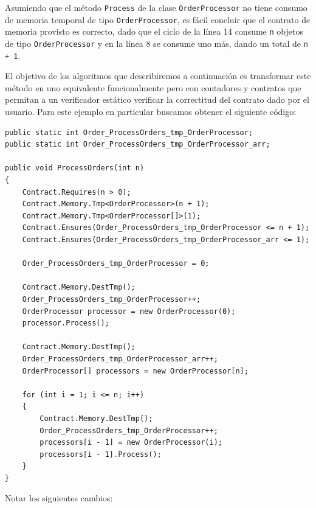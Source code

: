\documentclass[12pt,a4paper]{article}
\newcommand\mono[1]{\texttt{#1}}
\begin{document}
			Asumiendo que el método \mono{Process} de la clase \mono{OrderProcessor} no tiene consumo de memoria temporal de tipo \mono{OrderProcessor}, es fácil concluir que el contrato de memoria provisto es correcto, dado que el ciclo de la línea 14 consume \mono{n} objetos de tipo \mono{OrderProcessor} y en la línea 8 se consume uno más, dando un total de \mono{n + 1}.

			El objetivo de los algoritmos que describiremos a continuación es transformar este método en uno equivalente funcionalmente pero con contadores y contratos que permitan a un verificador estático verificar la correctitud del contrato dado por el usuario. Para este ejemplo en particular buscamos obtener el siguiente código:

			\vspace{15pt}
			\begin{lstlisting}[caption=Ejemplo motivacional para instrumentación (instrumentado), label=ejanotinstrinst]
public static int Order_ProcessOrders_tmp_OrderProcessor;
public static int Order_ProcessOrders_tmp_OrderProcessor_arr;

public void ProcessOrders(int n)
{
	Contract.Requires(n > 0);
	Contract.Memory.Tmp<OrderProcessor>(n + 1);
	Contract.Memory.Tmp<OrderProcessor[]>(1);
	Contract.Ensures(Order_ProcessOrders_tmp_OrderProcessor <= n + 1);
	Contract.Ensures(Order_ProcessOrders_tmp_OrderProcessor_arr <= 1);

	Order_ProcessOrders_tmp_OrderProcessor = 0;

	Contract.Memory.DestTmp();
	Order_ProcessOrders_tmp_OrderProcessor++;
	OrderProcessor processor = new OrderProcessor(0);
	processor.Process();

	Contract.Memory.DestTmp();
	Order_ProcessOrders_tmp_OrderProcessor_arr++;
	OrderProcessor[] processors = new OrderProcessor[n];

	for (int i = 1; i <= n; i++)
	{
		Contract.Memory.DestTmp();
		Order_ProcessOrders_tmp_OrderProcessor++;
		processors[i - 1] = new OrderProcessor(i);
		processors[i - 1].Process();
	}
}
			\end{lstlisting}

			Notar los siguientes cambios:
\end{document}
